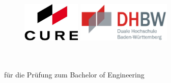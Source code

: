 

\begin{titlepage}

\centering
\begin{figure}[t]
    \begin{minipage}[]{0.49\textwidth}
        \flushleft
        \includegraphics[height=1.9cm]{images/essential/firmenlogo.png}
    \end{minipage}
    \begin{minipage}[]{0.49\textwidth}
        \flushright
        \includegraphics[width=4.5cm]{images/essential/dhbw.png}
    \end{minipage}
\end{figure}

\enlargethispage{20mm}
\vspace{15mm}

\begin{center}
	\doublespacing
	\vspace*{6mm}	
	\begin{minipage}{.7\textwidth}
		\centering
		{\Large{\titel}}
	\end{minipage}\\
	\vspace*{15mm}	{\textbf{\MakeUppercase{\arbeit}}}\\
	\onehalfspacing
	\vfill
	für die Prüfung zum %
    Bachelor of Engineering\\
	\vspace*{9mm}
	\vspace*{3mm}		\langartikelstudiengang{} \langstudiengang{} \textbf{\studiengang}\\
	\vspace*{3mm}		\langanderdh{} \dhbw\\
	\vspace*{15mm}	    \langvon\\
	\vspace*{3mm}		{\large\textbf \autor}\\
	\vspace*{12mm}	    \datumAbgabe\\
\end{center}


\end{titlepage}
